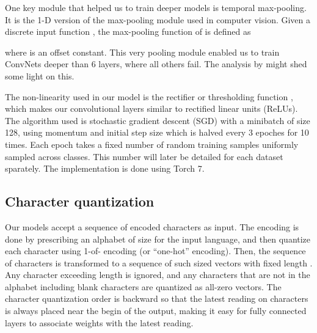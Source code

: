 \documentclass{article} \usepackage{nips15submit_e,times}
\begin{document}
One key module that helped us to train deeper models is temporal max-pooling. It is the 1-D version of the max-pooling module used in computer vision\cite{BBLP10}. Given a discrete input function , the max-pooling function  of  is defined as

where  is an offset constant. This very pooling module enabled us to train ConvNets deeper than 6 layers, where all others fail. The analysis by \cite{BPL10} might shed some light on this.

The non-linearity used in our model is the rectifier or thresholding function , which makes our convolutional layers similar to rectified linear units (ReLUs)\cite{NH10}. The algorithm used is stochastic gradient descent (SGD) with a minibatch of size 128, using momentum\cite{P64}\cite{SMDH13}  and initial step size  which is halved every 3 epoches for 10 times. Each epoch takes a fixed number of random training samples uniformly sampled across classes. This number will later be detailed for each dataset sparately. The implementation is done using Torch 7\cite{CKF11}.

\subsection{Character quantization}

Our models accept a sequence of encoded characters as input. The encoding is done by prescribing an alphabet of size  for the input language, and then quantize each character using 1-of- encoding (or ``one-hot'' encoding). Then, the sequence of characters is transformed to a sequence of such  sized vectors with fixed length . Any character exceeding length  is ignored, and any characters that are not in the alphabet including blank characters are quantized as all-zero vectors. The character quantization order is backward so that the latest reading on characters is always placed near the begin of the output, making it easy for fully connected layers to associate weights with the latest reading.
\end{document}
